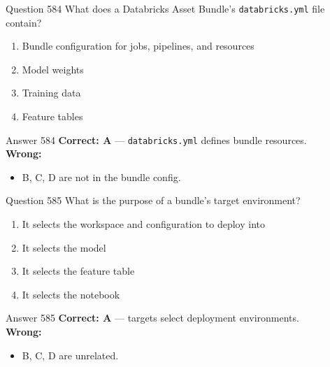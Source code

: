 \documentclass[aspectratio=169,11pt]{beamer}
\begin{document}
	\begin{frame}{Question 584}
		What does a Databricks Asset Bundle's \texttt{databricks.yml} file contain?
		\begin{enumerate}[label=\Alph*.]
			\item Bundle configuration for jobs, pipelines, and resources
			\item Model weights
			\item Training data
			\item Feature tables
		\end{enumerate}
	\end{frame}
	\begin{frame}{Answer 584}
		\textbf{Correct: A} --- \texttt{databricks.yml} defines bundle resources.\\
		\vspace{0.5em}
		\textbf{Wrong:}
		\begin{itemize}
			\item B, C, D are not in the bundle config.
		\end{itemize}
	\end{frame}
	
	\begin{frame}{Question 585}
		What is the purpose of a bundle's target environment?
		\begin{enumerate}[label=\Alph*.]
			\item It selects the workspace and configuration to deploy into
			\item It selects the model
			\item It selects the feature table
			\item It selects the notebook
		\end{enumerate}
	\end{frame}
	\begin{frame}{Answer 585}
		\textbf{Correct: A} --- targets select deployment environments.\\
		\vspace{0.5em}
		\textbf{Wrong:}
		\begin{itemize}
			\item B, C, D are unrelated.
		\end{itemize}
	\end{frame}
	
\end{document}
